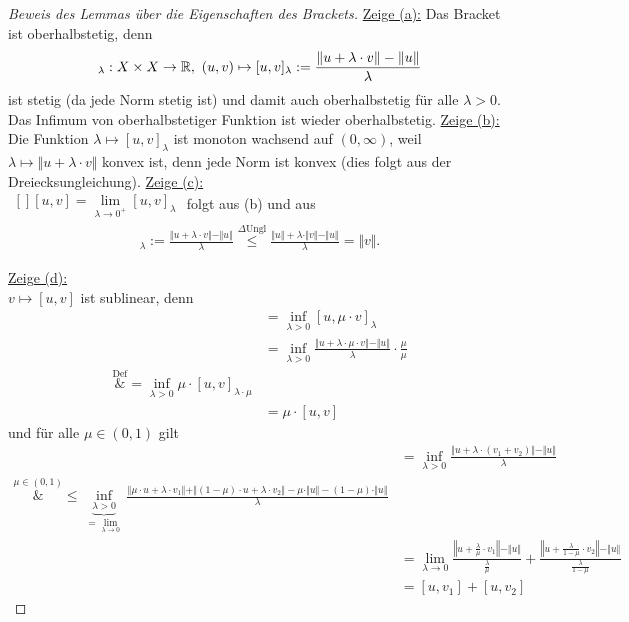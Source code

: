 \begin{proof}[Beweis des Lemmas über die Eigenschaften des Brackets]\enter
	\underline{Zeige (a):} Das Bracket ist oberhalbstetig, denn
	\begin{align*}
		[\cdot,\cdot]_\lambda:X\times X\to\R,~(u,v)\mapsto[u,v]_\lambda:=\frac{\Vert u+\lambda\cdot v\Vert - \Vert u\Vert}{\lambda}
	\end{align*}
	ist stetig (da jede Norm stetig ist) und damit auch oberhalbstetig für alle $\lambda>0$. 
	Das Infimum von oberhalbstetiger Funktion ist wieder oberhalbstetig.\nl
	\underline{Zeige (b):}\\
	Die Funktion $\lambda\mapsto[u,v]_\lambda$ ist monoton wachsend auf $(0,\infty)$, 
	weil $\lambda\mapsto\Vert u+\lambda\cdot v\Vert$ konvex ist, denn jede Norm ist konvex (dies folgt aus der Dreiecksungleichung).\nl
	\underline{Zeige (c):}\\
	$\begin{aligned}[]
		[u,v]=\lim\limits_{\lambda\to0^+}[u,v]_\lambda
	\end{aligned}$ folgt aus (b) und aus
	\begin{align*}
		[u,v]_\lambda:=\frac{\Vert u+\lambda\cdot v\Vert-\Vert u\Vert}{\lambda}
		\stackrel{\Delta\text{Ungl}}{\leq}
		\frac{\Vert u\Vert+\lambda\cdot\Vert v\Vert-\Vert u\Vert}{\lambda}
		=\Vert v\Vert.
	\end{align*}

	\underline{Zeige (d):}\\
	$v\mapsto[u,v]$ ist sublinear, denn
	\begin{align*}
		[u,\mu\cdot v]
		&=
		\inf\limits_{\lambda>0}[u,\mu\cdot v]_\lambda\\
		&=\inf\limits_{\lambda>0}\frac{\Vert u+\lambda\cdot\mu\cdot v\Vert-\Vert u\Vert}{\lambda}\cdot\frac{\mu}{\mu}\\
		\overset{\text{Def}}&=
		\inf\limits_{\lambda>0}\mu\cdot[u,v]_{\lambda\cdot\mu}\\
		&=\mu\cdot[u,v]
	\end{align*}
	und für alle $\mu\in(0,1)$ gilt
	\begin{align*}
		[u,v_1+v_2]
		&=
		\inf\limits_{\lambda>0}\frac{\Vert u+\lambda\cdot(v_1+v_2)\Vert-\Vert u\Vert}{\lambda}\\
		\overset{\mu\in(0,1)}&{\leq}
		\underbrace{\inf\limits_{\lambda>0}}_{=\lim\limits_{\lambda\to0}}
		\frac{\Vert\mu\cdot u+\lambda\cdot v_1\Vert+\Vert(1-\mu)\cdot u+\lambda\cdot v_2\Vert-\mu\cdot\Vert u\Vert-(1-\mu)\cdot\Vert u\Vert}{\lambda}\\
		&=\lim\limits_{\lambda\to0}\frac{\left\Vert u+\frac{\lambda}{\mu}\cdot v_1\right\Vert-\Vert u\Vert}{\frac{\lambda}{\mu}}+\frac{\left\Vert u+\frac{\lambda}{1-\mu}\cdot v_2\right\Vert-\Vert u\Vert}{\frac{\lambda}{1-\mu}}\\
		&=[u,v_1]+[u,v_2]
	\end{align*}


\end{proof}
